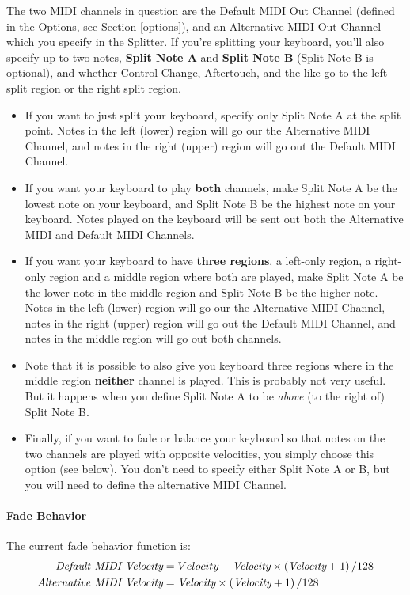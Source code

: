 \documentclass{article}
\begin{document}
The two MIDI channels in question are the Default MIDI Out Channel (defined in the Options, see Section \ref{options}), and an Alternative MIDI Out Channel which you specify in the Splitter.  If you're splitting your keyboard, you'll also specify up to two notes, {\bf Split Note A} and {\bf Split Note B}  (Split Note B is optional), and whether Control Change, Aftertouch, and the like go to the left split region or the right split region.

\begin{itemize}
\item  If you want to just split your keyboard, specify only Split Note A at the split point.  Notes in the left (lower) region will go our the Alternative MIDI Channel, and notes in the right (upper) region will go out the Default MIDI Channel.

\item If you want your keyboard to play {\bf both} channels, make Split Note A be the lowest note on your keyboard, and Split Note B be the highest note on your keyboard.    Notes played on the keyboard will be sent out both the Alternative MIDI and Default MIDI Channels. 

\item If you want your keyboard to have {\bf three regions}, a left-only region, a right-only region and a middle region where both are played, make Split Note A be the lower note in the middle region and Split Note B be the higher note.   Notes in the left (lower) region will go our the Alternative MIDI Channel, notes in the right (upper) region will go out the Default MIDI Channel, and notes in the middle region will go out both channels.

\item Note that it is possible to also give you keyboard three regions where in the middle region {\bf neither} channel is played.  This is probably not very useful.  But it happens when you define Split Note A to be {\it above} (to the right of) Split Note B.

\item Finally, if you want to fade or balance your keyboard so that notes on the two channels are played with opposite velocities, you simply choose this option (see below).  You don't need to specify either Split Note A or B, but you will need to define the alternative MIDI Channel.
\end{itemize}

\paragraph{Fade Behavior}  The current fade behavior function is:
\[
\begin{split}
\text{\it Default MIDI Velocity} &= Velocity - \text{\it Velocity} \times \left( \text{\it Velocity} + 1 \right) / 128\\
\text{\it Alternative MIDI Velocity} &= \text{\it Velocity} \times \left( \text{\it Velocity} + 1 \right) / 128
\end{split}
\]
\end{document}
